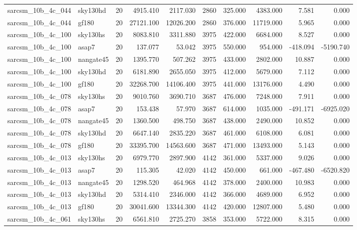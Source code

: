 \begin{longtable}{llrrrrrrrr}
sarcsm\_10b\_4c\_044 & sky130hd & 20 & 4915.410 & 2117.030 & 2860 & 325.000 & 4383.000 & 7.581 & 0.000 \\
sarcsm\_10b\_4c\_044 & gf180 & 20 & 27121.100 & 12026.200 & 2860 & 376.000 & 11719.000 & 5.965 & 0.000 \\
sarcsm\_10b\_4c\_100 & sky130hs & 20 & 8083.810 & 3311.880 & 3975 & 422.000 & 6684.000 & 8.527 & 0.000 \\
sarcsm\_10b\_4c\_100 & asap7 & 20 & 137.077 & 53.042 & 3975 & 550.000 & 954.000 & -418.094 & -5190.740 \\
sarcsm\_10b\_4c\_100 & nangate45 & 20 & 1395.770 & 507.262 & 3975 & 433.000 & 2802.000 & 10.887 & 0.000 \\
sarcsm\_10b\_4c\_100 & sky130hd & 20 & 6181.890 & 2655.050 & 3975 & 412.000 & 5679.000 & 7.112 & 0.000 \\
sarcsm\_10b\_4c\_100 & gf180 & 20 & 32268.700 & 14106.400 & 3975 & 441.000 & 13176.000 & 4.490 & 0.000 \\
sarcsm\_10b\_4c\_078 & sky130hs & 20 & 9010.760 & 3690.710 & 3687 & 476.000 & 7248.000 & 7.911 & 0.000 \\
sarcsm\_10b\_4c\_078 & asap7 & 20 & 153.438 & 57.970 & 3687 & 614.000 & 1035.000 & -491.171 & -6925.020 \\
sarcsm\_10b\_4c\_078 & nangate45 & 20 & 1360.500 & 498.750 & 3687 & 438.000 & 2490.000 & 10.852 & 0.000 \\
sarcsm\_10b\_4c\_078 & sky130hd & 20 & 6647.140 & 2835.220 & 3687 & 461.000 & 6108.000 & 6.081 & 0.000 \\
sarcsm\_10b\_4c\_078 & gf180 & 20 & 33395.700 & 14563.600 & 3687 & 471.000 & 13493.000 & 5.143 & 0.000 \\
sarcsm\_10b\_4c\_013 & sky130hs & 20 & 6979.770 & 2897.900 & 4142 & 361.000 & 5337.000 & 9.026 & 0.000 \\
sarcsm\_10b\_4c\_013 & asap7 & 20 & 115.305 & 42.020 & 4142 & 450.000 & 661.000 & -467.480 & -6520.820 \\
sarcsm\_10b\_4c\_013 & nangate45 & 20 & 1298.520 & 464.968 & 4142 & 378.000 & 2400.000 & 10.983 & 0.000 \\
sarcsm\_10b\_4c\_013 & sky130hd & 20 & 5314.410 & 2346.000 & 4142 & 366.000 & 4689.000 & 6.952 & 0.000 \\
sarcsm\_10b\_4c\_013 & gf180 & 20 & 30041.600 & 13344.300 & 4142 & 420.000 & 12807.000 & 5.480 & 0.000 \\
sarcsm\_10b\_4c\_061 & sky130hs & 20 & 6561.810 & 2725.270 & 3858 & 353.000 & 5722.000 & 8.315 & 0.000 \\

\end{longtable}
